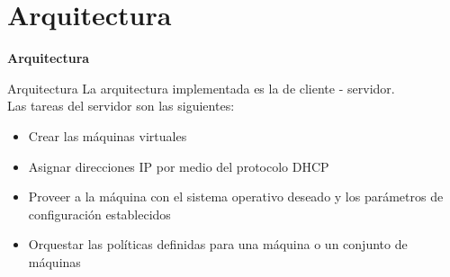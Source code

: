 \section{Arquitectura}

\begin{frame}
    \Huge
    \centering
    \textbf{Arquitectura}

\end{frame}

\begin{frame}{Arquitectura}
    \vspace{-1.5cm}
    La arquitectura implementada es la de cliente - servidor. 
    \\
    Las tareas del servidor son las siguientes:
    \begin{itemize}
        \item Crear las máquinas virtuales
        \item Asignar direcciones IP por medio del protocolo DHCP
        \item Proveer a la máquina con el sistema operativo deseado y los parámetros de configuración establecidos
        \item Orquestar las políticas definidas para una máquina o un conjunto de máquinas
    \end{itemize}

\end{frame}

